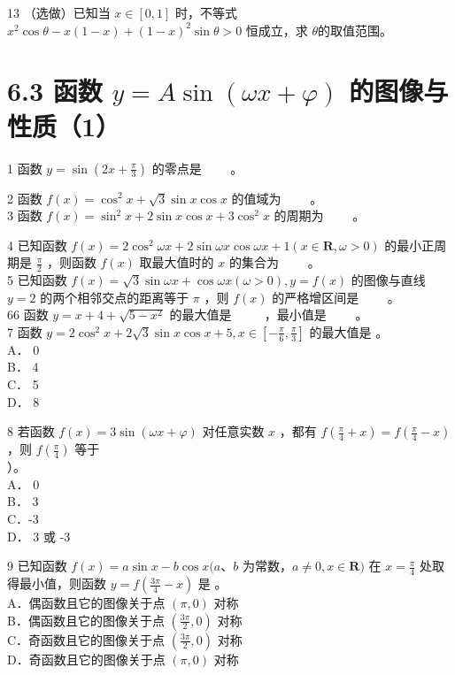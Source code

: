 \documentclass[10pt]{article}
\begin{document}
13 （选做）已知当 \(x \in[0,1]\) 时，不等式 \(x^{2} \cos \theta-x(1-x)+(1-x)^{2} \sin \theta>0\) 恒成立，求 \(\theta\)的取值范围。

\section*{6.3 函数 \(y=A \sin (\omega x+\varphi)\) 的图像与性质（1）}
1 函数 \(y=\sin \left(2 x+\frac{\pi}{3}\right)\) 的零点是 \(\qquad\)。

2 函数 \(f(x)=\cos ^{2} x+\sqrt{3} \sin x \cos x\) 的值域为 \(\qquad\)。\\
3 函数 \(f(x)=\sin ^{2} x+2 \sin x \cos x+3 \cos ^{2} x\) 的周期为 \(\qquad\)。

4 已知函数 \(f(x)=2 \cos ^{2} \omega x+2 \sin \omega x \cos \omega x+1(x \in \mathbf{R}, \omega>0)\) 的最小正周期是 \(\frac{\pi}{2}\) ，则函数 \(f(x)\) 取最大值时的 \(x\) 的集合为 \(\qquad\)。\\
5 已知函数 \(f(x)=\sqrt{3} \sin \omega x+\cos \omega x(\omega>0), y=f(x)\) 的图像与直线 \(y=2\) 的两个相邻交点的距离等于 \(\pi\) ，则 \(f(x)\) 的严格增区间是 \(\qquad\)。\\
66 函数 \(y=x+4+\sqrt{5-x^{2}}\) 的最大值是 \(\qquad\) ，最小值是 \(\qquad\)。\\
7 函数 \(y=2 \cos ^{2} x+2 \sqrt{3} \sin x \cos x+5, x \in\left[-\frac{\pi}{6}, \frac{\pi}{3}\right]\) 的最大值是 。\\
A． 0\\
B． 4\\
C． 5\\
D． 8

8 若函数 \(f(x)=3 \sin (\omega x+\varphi)\) 对任意实数 \(x\) ，都有 \(f\left(\frac{\pi}{4}+x\right)=f\left(\frac{\pi}{4}-x\right)\) ，则 \(f\left(\frac{\pi}{4}\right)\) 等于\\
）。\\
A． 0\\
B． 3\\
C．-3\\
D． 3 或 -3

9 已知函数 \(f(x)=a \sin x-b \cos x(a 、 b\) 为常数，\(a \neq 0, x \in \mathbf{R})\) 在 \(x=\frac{\pi}{4}\) 处取得最小值，则函数 \(y=f\left(\frac{3 \pi}{4}-x\right)\) 是 。\\
A．偶函数且它的图像关于点 \((\pi, 0)\) 对称\\
B．偶函数且它的图像关于点 \(\left(\frac{3 \pi}{2}, 0\right)\) 对称\\
C．奇函数且它的图像关于点 \(\left(\frac{3 \pi}{2}, 0\right)\) 对称\\
D．奇函数且它的图像关于点 \((\pi, 0)\) 对称
\end{document}
